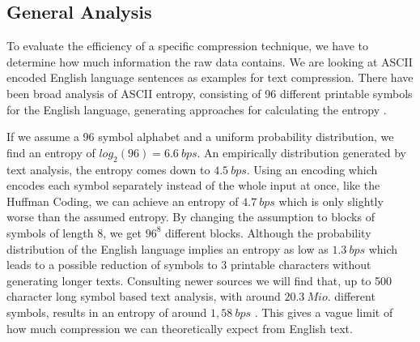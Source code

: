 \subsection{General Analysis}
\par{
To evaluate the efficiency of a specific compression technique, we have to determine how much information the raw data contains. We are looking at ASCII encoded English language sentences as examples for text compression. There have been broad analysis of ASCII entropy, consisting of 96 different printable symbols for the English language, generating approaches for calculating the entropy \cite{entropy-fernau}.
}

\par {
If we assume a 96 symbol alphabet and a uniform probability distribution, we find an entropy of $log_2 (96) = 6.6 \: bps$. An empirically distribution generated by text analysis, the entropy comes down to $4.5 \: bps$. Using an encoding which encodes each symbol separately instead of the whole input at once, like the Huffman Coding, we can achieve an entropy of $4.7 \: bps$ which is only slightly worse than the assumed entropy. By changing the assumption to blocks of symbols of length 8, we get $96^8$ different blocks. Although the probability distribution of the English language implies an entropy as low as $1.3 \: bps$ which leads to a possible reduction of symbols to 3 printable characters without generating longer texts. Consulting newer sources we will find that, up to 500 character long symbol based text analysis, with around $20.3 \: Mio.$ different symbols, results in an entropy of around $1,58 \: bps$ \cite{entropy-new}. This gives a vague limit of how much compression we can theoretically expect from English text.}


